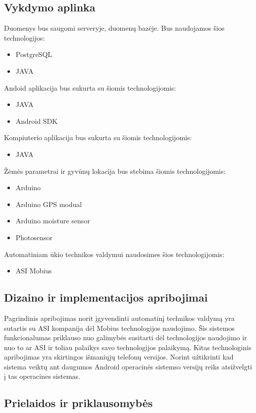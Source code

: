 \documentclass[oneside]{VUMIFPSkursinis}
\begin{document}
\subsection{Vykdymo aplinka}
Duomenys bus saugomi serveryje, duomenų bazėje. Bus naudojamos šios technologijos:
	\begin{itemize}
		\item PostgreSQL
		\item JAVA
	\end{itemize}
Andoid aplikacija bus sukurta su šiomis technologijomis:
	\begin{itemize}
		\item JAVA
		\item Android SDK
	\end{itemize}
Kompiuterio aplikacija bus sukurta su šiomis technologijomis:
	\begin{itemize}
		\item JAVA
	\end{itemize}
Žėmės parametrai ir gyvūnų lokacija bus stebima šiomis technologijomis:
	\begin{itemize}
		\item Arduino
		\item Arduino GPS modual
		\item Arduino moisture sensor
		\item Photosensor
	\end{itemize}
Automatiniam ūkio technikos valdymui naudosimes šios technologijomis:
	\begin{itemize}		
		\item ASI Mobius
	\end{itemize}
\subsection{Dizaino ir implementacijos apribojimai}
Pagrindinis apribojimas norit įgyvendinti automatinį technikos valdymą yra sutartis su ASI kompanija dėl Mobius technologijos naudojimo. Šis sistemos funkcionalumas priklauso nuo galimybės susitarti dėl technologijos naudojimo ir nuo to ar ASI ir toliau palaikys savo technologijos palaikymą. Kitas technologinis apribojimas yra skirtingos išmaniųjų telefonų versijos. Norint užtikrinti kad sistema veiktų ant daugumos Android operacinės sistemso versijų reiks atsižvelgti į tas operacines sistemas. 


\subsection{Prielaidos ir priklausomybės}
\end{document}
